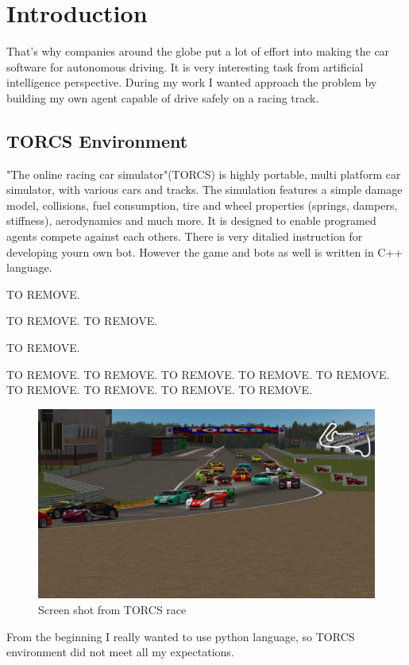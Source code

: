 \documentclass[declaration,shortabstract,english,inz]{iithesis}
\author         {Kacper Kulczak}
\begin{document}

\chapter{Introduction}

That's why companies around the globe put a lot of effort into making the car software for autonomous driving. It is very interesting task from artificial intelligence perspective. During my work I wanted approach the problem by building my own agent capable of drive safely on a racing track.




\section{TORCS Environment}
"The online racing car simulator"(TORCS) is highly portable, multi platform car simulator, with various cars and tracks.  The simulation features a simple damage model, collisions, fuel consumption, tire and wheel properties (springs, dampers, stiffness), aerodynamics and much more. It is designed to enable programed agents compete against each others. There is very ditalied instruction for developing yourn own bot. However the game and bots as well is written in C++ language.

TO REMOVE.

TO REMOVE.
TO REMOVE.

TO REMOVE.

TO REMOVE.
TO REMOVE.
TO REMOVE.
TO REMOVE.
TO REMOVE.
TO REMOVE.
TO REMOVE.
TO REMOVE.
TO REMOVE.
\begin{figure}[h]
    \includegraphics[width=\linewidth]{img/torcs_look.jpeg}
    \caption{Screen shot from TORCS race}
    \label{fig:torcs}
\end{figure}
From the beginning I really wanted to use python language, so TORCS environment did not meet all my expectations. 
\end{document}
